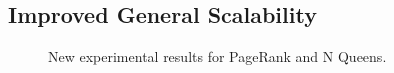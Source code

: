 \documentclass[10pt]{article}
\begin{document}
\subsection{Improved General Scalability}

\begin{figure}[]
\begin{center}
\end{center}
\caption{New experimental results for PageRank and N Queens.}
\label{fig:res1}
\end{figure}
\end{document}
